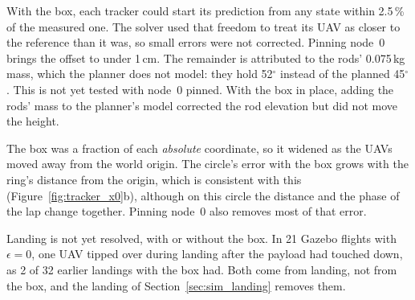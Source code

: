 \begin{table}[h]
\centering
\caption{Ring error with the relaxed and the pinned initial condition, no integral action. The
circle with $\epsilon = 0.025$ is a single run on an earlier code version; its horizontal error
reproduces on the current code (2.8\,cm, with the height integral on).}
\label{tab:x0}

\end{table}

With the box, each tracker could start its prediction from any state within 2.5\,\% of the
measured one. The solver used that freedom to treat its UAV as closer to the reference than it
was, so small errors were not corrected. Pinning node~0 brings the offset to under 1\,cm. The
remainder is attributed to
the rods' 0.075\,kg mass, which the planner does not model: they hold 52$^\circ$ instead of the
planned 45$^\circ$. This is not yet tested with node~0 pinned. With the box in place, adding the
rods' mass to the planner's model corrected the rod elevation but did not move the height.


The box was a fraction of each \emph{absolute} coordinate, so it widened as the UAVs moved away from
the world origin. The circle's error with the box grows with the ring's distance from the origin,
which is consistent with this (Figure~\ref{fig:tracker_x0}b), although on this circle the distance and
the phase of the lap change together. Pinning node~0 also removes most of that error.

Landing is not yet resolved, with or without the box. In 21 Gazebo flights with $\epsilon = 0$, one
UAV tipped over during landing after the payload had touched down, as 2 of 32 earlier landings with the
box had. Both come from landing, not from the box, and the landing of Section~\ref{sec:sim_landing}
removes them.

